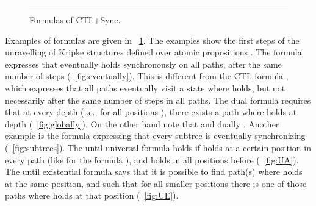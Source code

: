 \documentclass{article}
\begin{document}
\begin{figure}[!tb]
\begin{center}
{\begin{gpicture}
\end{gpicture}

 }
		\quad
	\smallskip
	\hrule
	\smallskip
		\caption{Formulas of CTL+Sync.\label{fig:example}}\end{center}
\end{figure}
\begin{comment}
\begin{figure}[!tb]
  \begin{center}

\caption{Examples.\label{fig:example}}
  \end{center}
\end{figure}
\end{comment}
Examples of formulas are given in \figurename~\ref{fig:example}.
The examples show the first steps of the unravelling of Kripke structures
defined over atomic propositions .
The formula  expresses that 
eventually holds synchronously on all paths, after the same 
number of steps (\figurename~\ref{fig:eventually}). 
This is different from the CTL formula , which expresses that all paths
eventually visit a state where  holds, but not necessarily
after the same number of steps in all paths.
The dual formula  requires that at every depth (i.e., for all positions ),
there exists a path where  holds at depth  (\figurename~\ref{fig:globally}). 
On the other hand note that  and dually .
Another example is the formula  expressing
that every subtree is eventually synchronizing (\figurename~\ref{fig:subtrees}).
The until universal formula  holds if  holds at a certain position
in every path (like for the formula ), and  holds in all
positions before (\figurename~\ref{fig:UA}). The until existential 
formula  says that it is possible to find path(s)
where  holds at the same position, and such that for all smaller positions 
there is one of those paths where  holds at that position (\figurename~\ref{fig:UE}).
\end{document}
